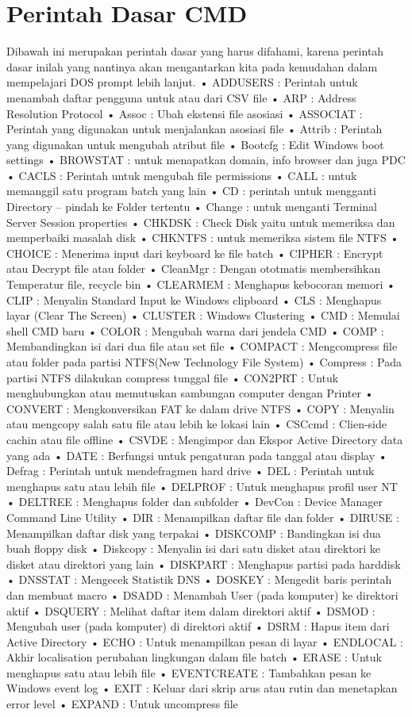 \documentclass{article}
\begin{document}
\section{Perintah Dasar CMD}
Dibawah ini merupakan perintah dasar yang harus difahami, karena perintah dasar inilah yang nantinya akan mengantarkan kita pada kemudahan dalam mempelajari DOS prompt lebih lanjut.
• ADDUSERS : Perintah untuk menambah  daftar pengguna untuk atau dari CSV file  
• ARP : Address Resolution Protocol  
• Assoc : Ubah ekstensi file  asosiasi  
• ASSOCIAT : Perintah yang digunakan untuk menjalankan asosiasi file  
• Attrib : Perintah yang digunakan untuk mengubah atribut file  
• Bootcfg : Edit Windows boot settings  
• BROWSTAT : untuk menapatkan domain, info browser dan juga PDC  
• CACLS : Perintah untuk mengubah file permissions  
• CALL : untuk memanggil satu program batch yang lain  
• CD : perintah untuk mengganti Directory – pindah ke Folder tertentu  
• Change : untuk menganti Terminal Server Session properties  
• CHKDSK : Check Disk yaitu untuk memeriksa dan memperbaiki masalah disk  
• CHKNTFS : untuk memeriksa sistem file NTFS  
• CHOICE : Menerima input dari keyboard ke file batch  
• CIPHER : Encrypt atau Decrypt file atau folder  
• CleanMgr : Dengan ototmatis membersihkan Temperatur file, recycle bin  
• CLEARMEM : Menghapus kebocoran memori  
• CLIP : Menyalin Standard Input ke Windows clipboard  
• CLS : Menghapus layar (Clear The Screen)  
• CLUSTER : Windows Clustering  
• CMD : Memulai shell CMD baru  
• COLOR : Mengubah warna dari jendela CMD  
• COMP : Membandingkan isi dari dua file atau set file  
• COMPACT : Mengcompress file atau folder pada partisi NTFS(New Technology File System)  
• Compress : Pada partisi NTFS dilakukan compress tunggal file  
• CON2PRT : Untuk menghubungkan atau memutuskan sambungan computer dengan Printer  
• CONVERT : Mengkonversikan FAT ke dalam drive NTFS  
• COPY : Menyalin atau mengcopy salah satu file atau lebih ke lokasi lain  
• CSCcmd : Clien-side cachin atau file offline  
• CSVDE : Mengimpor dan Ekspor Active Directory data yang ada  
• DATE : Berfungsi untuk pengaturan pada tanggal atau display  
• Defrag : Perintah untuk mendefragmen hard drive  
• DEL : Perintah untuk menghapus satu atau lebih file  
• DELPROF : Untuk menghapus  profil user NT  
• DELTREE : Menghapus folder dan  subfolder  
• DevCon : Device Manager Command Line Utility  
• DIR : Menampilkan daftar file dan folder  
• DIRUSE : Menampilkan daftar disk yang terpakai  
• DISKCOMP : Bandingkan  isi dua buah floppy disk  
• Diskcopy : Menyalin isi dari satu disket atau direktori ke disket atau direktori yang lain  
• DISKPART : Menghapus partisi pada harddisk  
• DNSSTAT : Mengecek Statistik DNS  
• DOSKEY : Mengedit baris perintah dan membuat macro  
• DSADD : Menambah User (pada komputer) ke direktori aktif  
• DSQUERY : Melihat daftar item dalam direktori aktif  
• DSMOD : Mengubah user (pada komputer) di direktori aktif   
• DSRM : Hapus item dari Active Directory  
• ECHO : Untuk menampilkan pesan di layar  
• ENDLOCAL : Akhir localisation  perubahan lingkungan dalam file batch  
• ERASE : Untuk menghapus satu atau lebih file  
• EVENTCREATE : Tambahkan pesan ke Windows event log  
• EXIT : Keluar dari skrip arus atau rutin dan menetapkan error level  
• EXPAND : Untuk uncompress file  
\end{document}
